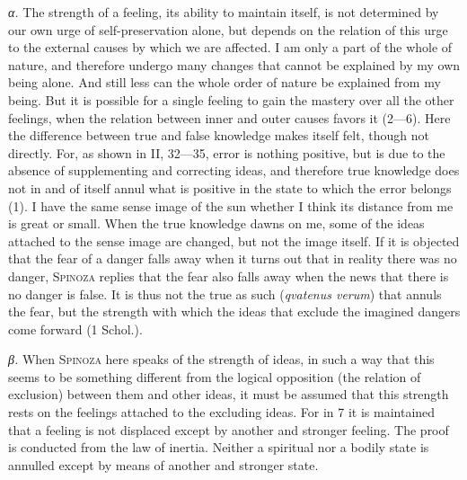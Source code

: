 \documentclass[12pt]{article}
\newcommand{\opage}[1]{\marginnote{\footnotesize\textit{[#1]}}}
\begin{document}
\textit{α.} The strength of a feeling, its ability to maintain itself, is not determined by our own
urge of self-preservation alone, but depends on the relation of this urge to the external causes by
which we are affected. I am only a part of the whole of nature, and therefore undergo many changes
that cannot be explained by my own being alone. And still less can the whole order of nature be
explained from my being. But it is possible for a single feeling to gain the mastery over all the
other feelings, when the relation between inner and outer causes favors it (2---6). Here the
difference between true and false knowledge makes itself felt, though not directly. For, as shown
in II, 32---35, error is nothing positive, but is due to the absence of supplementing and
correcting ideas, and therefore true knowledge does not in and of itself annul what is positive in
the state to which the error belongs (1). I have the same sense image of the sun whether I think
its distance from me is great or small. When the true knowledge dawns on me, some of the ideas
attached to the sense image are changed, but not the image itself. If it is objected that the fear
of a danger falls away when it turns out that in reality there was no danger, \textsc{Spinoza}
replies that the fear also falls away when the news that there is no danger is false. It is thus
not the true as such (\textit{qvatenus verum}) that \opage{74}annuls the fear, but the strength
with which the ideas that exclude the imagined dangers come forward (1 Schol.).

\textit{β.} When \textsc{Spinoza} here speaks of the strength of ideas, in such a way that this
seems to be something different from the logical opposition (the relation of exclusion) between
them and other ideas, it must be assumed that this strength rests on the feelings attached to the
excluding ideas. For in 7 it is maintained that a feeling is not displaced except by another and
stronger feeling. The proof is conducted from the law of inertia. Neither a spiritual nor a bodily
state is annulled except by means of another and stronger state.
\end{document}
